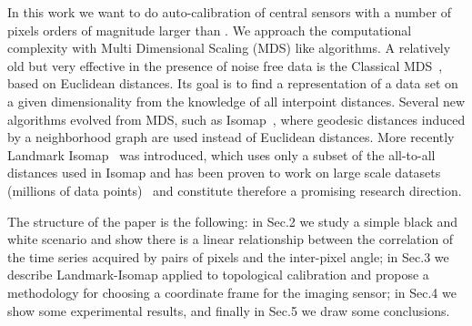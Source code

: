 In this work we want to do auto-calibration of central sensors with a number of pixels orders of magnitude larger than \cite{Olsson06,Grossmann10}.
We approach the computational complexity with Multi Dimensional Scaling (MDS) like algorithms. A relatively old but very effective in the presence of noise free data is the Classical MDS~\cite{MDS}, based on Euclidean distances. Its goal is to find a representation of a data set on a given dimensionality from the knowledge of all interpoint distances.
Several new algorithms evolved from MDS, such as Isomap~\cite{Isomap}, where geodesic distances induced by a neighborhood graph are used instead of Euclidean distances. More recently Landmark Isomap~\cite{Landmark} was introduced, which uses only a subset of the all-to-all distances used in Isomap and has been proven to work on large scale datasets %
(millions of data points)~\cite{Google08} and constitute therefore a promising research direction. 


The structure of the paper is the following:
in Sec.2 we study a simple black and white scenario and show there is a linear relationship between the correlation of the time series acquired by pairs of pixels and the inter-pixel angle;
in Sec.3 we describe Landmark-Isomap applied to topological calibration and propose
a methodology for choosing a coordinate frame for the imaging sensor;
in Sec.4 we show some experimental results, and finally in Sec.5 we draw some conclusions.
